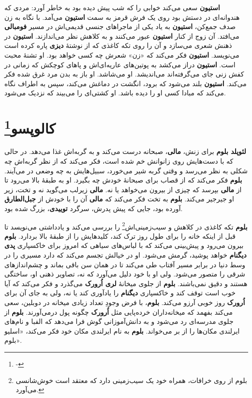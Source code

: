 \documentclass[12pt]{book}
\newcommand{\noun}[1]{{\textbf{#1}}}
\begin{document}
    \noun{استیون} سعی می‌کند خوابی را که شب پیش دیده بود به خاطر آورد: مردی که هندوانه‌ای در دستش بود روی یک فرش قرمز به سمت \noun{استیون} می‌آمد. با نگاه به زن صدف جمع‌کن، \noun{استیون} به یاد یکی از ماجراهای جنسی قدیمی‌اش در مسیر \noun{فومبالی} می‌افتد. آن زوج از کنار \noun{استیون} عبور می‌کنند و به کلاهش نظر می‌اندازند. \noun{استیون} در ذهنش شعری می‌سازد و آن را روی تکه‌ کاغذی که از نوشتهٔ \noun{دیزی} پاره کرده است می‌نویسد. \noun{استیون} فکر می‌کند که «زن» شعرش چه کسی خواهد بود. او تشنهٔ محبت است. \noun{استیون} دراز می‌کشد به پوتین‌های عاریه‌ای‌اش و پاهای کوچکش که زمانی در کفش زنی جای می‌گرفته‌اند می‌اندیشد. او می‌شاشد. او باز به بدن مرد غرق شده فکر می‌کند. \noun{استیون} بلند می‌شود که برود، انگشت در دماغش می‌کند، سپس به اطراف نگاه می‌کند که مبادا کسی او را دیده باشد. او کشتی‌ای را می‌بیند که نزدیک می‌شود.

    \chapter[کالوپسو]{کالوپسو\protect\footnote{-}}\label{ep:4}
    \noun{لئوپلد بلوم} برای زنش، \noun{مالی}، صبحانه درست می‌کند و به گربه‌اش غذا می‌دهد. در حالی که با دست‌هایش روی زانوانش خم شده است، فکر می‌کند که از نظر گربه‌اش چه شکلی به نظر می‌رسد و وقتی گربه شیر می‌خورد، سبیل‌هایش به چه وضعی در می‌آیند. \noun{بلوم} فکر می‌کند که از قصاب برای صبحانهٔ خودش چه بگیرد. او به طبقهٔ بالا می‌رود تا از \noun{مالی} بپرسد که چیزی از بیرون می‌خواهد یا نه. \noun{مالی} زیرلب می‌گوید نه و تخت، زیر او جیرجیر می‌کند. \noun{بلوم} به تخت فکر می‌کند که \noun{مالی} آن را با خودش از \noun{جبل‌الطارق} آورده بود، جایی که پیش پدرش، سرگرد \noun{توییدی}، بزرگ شده بود.

    \noun{بلوم} تکه کاغذی در کلاهش و سیب‌زمینی‌اش\footnote{بلوم از روی خرافات، همراه خود یک سیب‌زمینی دارد که معتقد است خوش‌شانسی می‌آورد.} را بررسی می‌کند و یادداشتی می‌نویسد تا قبل از اینکه خانه را برای طول روز ترک کند، کلیدهایش را از طبقهٔ بالا بردارد. \noun{بلوم} بیرون می‌رود و پیش‌بینی می‌کند که با لباس‌های سیاهی که امروز برای خاکسپاری \noun{پدی دیگنام} خواهد پوشید، گرمش می‌شود. او در خیالش تجسم می‌کند که دارد مسیری را در وسط دنیا در برابر مسیر آفتاب طی می‌کند تا در همان سن باقی بماند و چشم‌اندازهای شرقی را متصور می‌شود. ولی او با خود دلیل می‌آورد که نه، تصاویر ذهنی او، ساختگی هستند و دقیق نمی‌باشند. \noun{بلوم} از جلوی میخانهٔ \noun{لری اُرورک} می‌گذرد و فکر می‌کند که آیا خوب است توقف کند و خاکسپاری \noun{دیگنام} را یادآوری کند یا نه، ولی به جای آن برای \noun{اُرورک} روز خوبی آرزو می‌کند. \noun{بلوم}، با فرض وجودِ تعداد زیادی میخانه در دوبلین، سعی می‌کند بفهمد که میخانه‌داران خرده‌پایی مثل \noun{اُرورک} چگونه پول درمی‌آورند. \noun{بلوم} از جلوی مدرسه‌ای رد می‌شود و به دانش‌آموزانی گوش فرا می‌دهد که الفبا و نام‌های ایرلندی مکان‌ها را از بر می‌خواند. \noun{بلوم} به نام ایرلندی مکان خود فکر می‌کند، «اسلیو بلوم».
\end{document}
